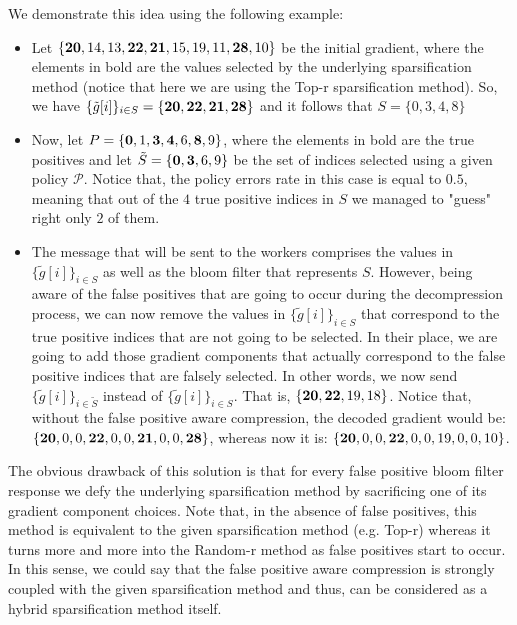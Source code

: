         We demonstrate this idea using the following example:
        \begin{itemize}
            \item Let $\{{\bf 20}, 14, 13, {\bf 22}, {\bf 21}, 15, 19, 11, {\bf 28}, 10\}$ be the initial gradient, where the elements in bold are the values selected by the underlying sparsification method (notice that here we are using the Top-r sparsification method).
            So, we have $\{\tilde{g}[i]\}_{i\in S} = \{{\bf 20, 22, 21, 28}\}$ and it follows that $S=\{0,3,4,8\}$
    
            \item Now, let $P=\{{\bf 0}, 1, {\bf 3}, {\bf 4}, 6, {\bf 8}, 9\}$, where the elements in bold are the true positives and 
            let $\tilde{S}=\{{\bf 0}, {\bf 3}, 6, 9\}$ be the set of indices selected using a given policy $\mathcal{P}$.
            Notice that, the policy errors rate in this case is equal to $0.5$, meaning that out of the $4$ true positive indices in $S$ we managed to "guess" right only $2$ of them.

            \item The message that will be sent to the workers comprises the values in $\{\tilde{g}[i]\}_{i\in S}$ as well as the bloom filter that represents $S$.
            However, being aware of the false positives that are going to occur during the decompression process, we can now remove the values in $\{\tilde{g}[i]\}_{i\in S}$ that correspond to the true positive indices that are not going to be selected. 
            In their place, we are going to add those gradient components that actually correspond to the false positive indices that are falsely selected.
            In other words, we now send $\{\tilde{g}[i]\}_{i\in \tilde{S}}$ instead of $\{\tilde{g}[i]\}_{i\in S}$.
            That is, $\{{\bf 20, 22}, 19, 18\}$.
            Notice that, without the false positive aware compression, the decoded gradient would be: $\{{\bf 20}, 0, 0, {\bf 22}, 0, 0, {\bf 21}, 0, 0, {\bf 28}\}$, 
            whereas now it is: $\{{\bf 20}, 0, 0, {\bf 22}, 0, 0, 19, 0, 0, 10\}$.
            
        \end{itemize}
        
        The obvious drawback of this solution is that for every false positive bloom filter response we defy the underlying sparsification method by sacrificing one of its gradient component choices.
        Note that, in the absence of false positives, this method is equivalent to the given sparsification method (e.g. Top-r) whereas it turns more and more into the Random-r method as false positives start to occur.
        In this sense, we could say that the false positive aware compression is strongly coupled with the given sparsification method and thus, can be considered as a hybrid sparsification method itself.
